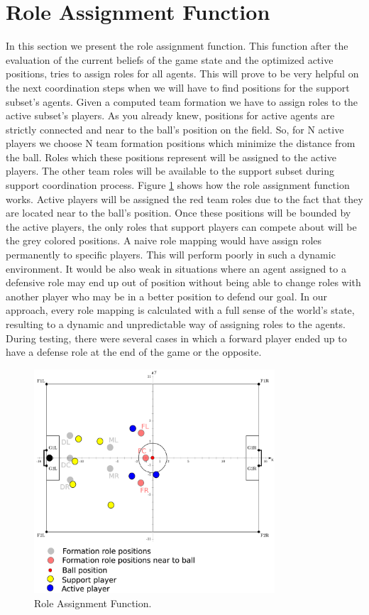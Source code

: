 \section{Role Assignment Function}
In this section we present the role assignment function. This function after the evaluation of the current beliefs of the game state and the optimized active positions, tries to assign roles for all agents. This will prove to be very helpful on the next coordination steps when we will have to find positions for the support subset's agents. Given a computed team formation we have to assign roles to the active subset's players. As you already knew, positions for active agents are strictly connected and near to the ball's position on the field. So, for N active players we choose N team formation positions which minimize the distance from the ball. Roles which these positions represent will be assigned to the active players. The other team roles will be available to the support subset during support coordination process. Figure \ref{fig:RoleAss} shows how the role assignment function works. Active players will be assigned the red team roles due to the fact that they are located near to the ball's position. Once these positions will be bounded by the active players, the only roles that support players can compete about will be the grey colored positions. A naive role mapping would have assign roles permanently to specific players. This will perform poorly in such a dynamic environment. It would be also weak in situations where an agent assigned to a defensive role may end up out of position without being able to change roles with another player who may be in a better position to defend our goal. In our approach, every role mapping is calculated with a full sense of the world's state, resulting to a dynamic and unpredictable way of assigning roles to the agents. During testing, there were several cases in which a forward player ended up to have a defense role at the end of the game or the opposite.

\begin{figure}[htb!]
\centering
  \includegraphics[width=0.8\textwidth]{Chapter4/figures/RoleAss.pdf}
  \caption{Role Assignment Function.} 
  \label{fig:RoleAss}
\end{figure}


